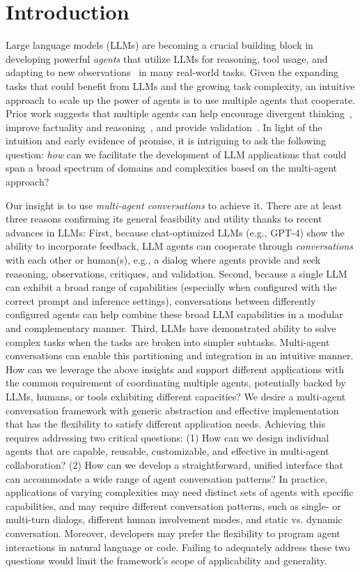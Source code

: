 \section{Introduction}

Large language models (LLMs) are becoming a crucial building block in developing powerful {\em agents} that utilize LLMs for reasoning, tool usage, and adapting to new observations~\cite{yao2022react,xi2023rise,wang2023survey} in many real-world tasks. 
Given the expanding tasks that could benefit from LLMs and the growing task complexity, an intuitive approach to scale up the power of agents is to use multiple agents that cooperate.
Prior work suggests that multiple agents can help encourage divergent thinking~\cite{liang-arxiv2023}, improve factuality and reasoning~\cite{du2023improving}, and provide validation~\cite{wu2023empirical}.
In light of the intuition and early evidence of promise, it is intriguing to ask the following question:
{\em how} can we facilitate the development of LLM applications that could span a broad spectrum of domains and complexities based on the multi-agent approach?


Our insight is to use \emph{multi-agent conversations} to achieve it. 
There are at least three reasons confirming its general feasibility and utility thanks to recent advances in LLMs: First, because chat-optimized LLMs (e.g., GPT-4) show the ability to incorporate feedback,  
LLM agents can cooperate through {\em conversations} with each other or human(s), e.g., a dialog where agents provide and seek reasoning, observations, critiques, and validation. Second, because a single LLM can exhibit a broad range of capabilities (especially when configured with the correct prompt and inference settings), conversations between differently configured agents can help 
combine
these broad LLM capabilities in a modular and complementary manner. 
{Third, LLMs have demonstrated ability to solve complex tasks when the tasks are broken into simpler subtasks. Multi-agent conversations can enable this partitioning and integration in an intuitive manner.} How can we leverage the above insights and support different applications with the common requirement of coordinating multiple agents, potentially backed by LLMs, humans, or tools exhibiting different capacities? 
We desire a multi-agent conversation framework with generic abstraction and effective implementation that has the flexibility to satisfy different application needs.
Achieving this requires addressing two critical questions:
(1) How can we design individual agents that are capable, reusable, customizable, and effective in multi-agent collaboration? (2) How can we develop a straightforward, unified interface that can accommodate a wide range of agent conversation patterns? 
In practice, applications of varying complexities may need distinct sets of agents with specific capabilities, and may require different conversation patterns, such as single- or multi-turn dialogs, different human involvement modes, and static vs. dynamic conversation. Moreover, developers may prefer the flexibility to program agent interactions in natural language or code. Failing to adequately address these two questions would limit the framework's scope of applicability and generality.

